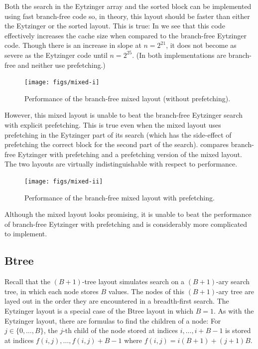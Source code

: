\documentclass{patmorin}
\begin{document}
Both the search in the Eytzinger array and the sorted block can be
implemented using fast branch-free code so, in theory, this layout
should be faster than either the Eytzinger or the sorted layout.
This is true: In  we see that this code effectively
increases the cache size when compared to the branch-free Eytzinger code.
Though there is an increase in slope at $n=2^{21}$, it does not become
as severe as the Eytzinger code until $n=2^{25}$.  (In 
both implementations are branch-free and neither use prefetching.)

\begin{figure}
   \begin{center}
     \texttt{[image: figs/mixed-i]}
   \end{center}
   \caption{Performance of the branch-free mixed layout (without prefetching).}
\end{figure}

However, this mixed layout is unable to beat the branch-free Eytzinger
search with explicit prefetching. This is true even when the mixed layout
uses prefetching in the Eytzinger part of its search (which has the
side-effect of prefetching the correct block for the second part of the
search).  compares branch-free Eytzinger with prefetching
and a prefetching version of the mixed layout.  The two layouts are virtually indistinguishable with respect to performance. 

\begin{figure}
   \begin{center}
     \texttt{[image: figs/mixed-ii]}
   \end{center}
   \caption{Performance of the branch-free mixed layout with prefetching.}
\end{figure}

\begin{lesson}
  Although the mixed layout looks promising, it is unable to beat
  the performance of branch-free Eytzinger with prefetching and is
  considerably more complicated to implement.
\end{lesson}

\subsection{Btree}

Recall that the $(B+1)$-tree layout simulates search on a $(B+1)$-ary
search tree, in which each node stores $B$ values.  The nodes of this
$(B+1)$-ary tree are layed out in the order they are encountered in
a breadth-first search.  The Eytzinger layout is a special
case of the Btree layout in which $B=1$. As with the Eytzinger layout, there
are formulas to find the children of a node: For $j\in\{0,\ldots,B\}$, the
$j$-th child of the node stored at indices $i,\ldots,i+B-1$ is stored
at indices $f(i,j),\ldots,f(i,j)+B-1$ where $f(i,j)=i(B+1)+(j+1)B$.
\end{document}

